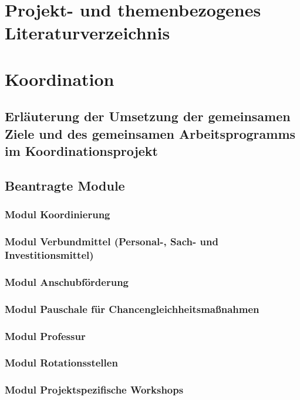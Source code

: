 \documentclass[german, 53.02]{proposal}
\begin{document}
\section{Projekt- und themenbezogenes Literaturverzeichnis}
\printbibliography[heading=none]


\section{Koordination}

\subsection{Erläuterung der Umsetzung der gemeinsamen Ziele und des gemeinsamen Arbeitsprogramms im Koordinationsprojekt}

\subsection{Beantragte Module}

\subsubsection{Modul Koordinierung}

\subsubsection{Modul Verbundmittel (Personal-, Sach- und Investitionsmittel)}

\subsubsection{Modul Anschubförderung}

\subsubsection{Modul Pauschale für Chancengleichheitsmaßnahmen}

\subsubsection{Modul Professur}

\subsubsection{Modul Rotationsstellen}

\subsubsection{Modul Projektspezifische Workshops}
\end{document}
